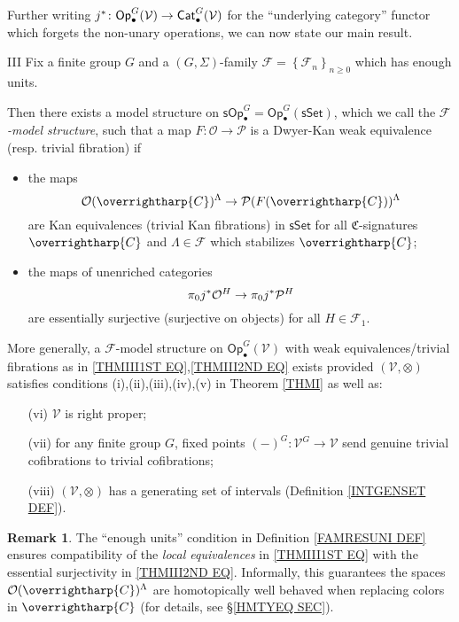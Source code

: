 \documentclass[a4paper,10pt
,draft
]{article}%
\numberwithin{equation}{section}
\numberwithin{figure}{section}
\theoremstyle{definition} %
\newtheorem{remark}[equation]{Remark}%
\newcommand{\set}[1]{\left\{#1\right\}}%
\newcommand{\vect}[1]{\text{\overrightharp{\ensuremath{#1}}}}
\newcommand{\Op}{\mathsf{Op}}%
\newcommand{\F}{\ensuremath{\mathcal F}}
\newcommand{\V}{\ensuremath{\mathcal V}}
\renewcommand{\O}{\ensuremath{\mathcal O}}
\newcommand{\1}{\ensuremath{\mathbbm 1}}%
\begin{document}
Further writing 
$j^{\**} \colon 
\mathsf{Op}^G_{\bullet}(\V) \to \mathsf{Cat}^G_{\bullet}(\V)$
for the ``underlying category''
functor which forgets the non-unary operations, 
we can now state our main result.




\begin{customthm}{III}\label{THMIII}
Fix a finite group $G$ 
and a $(G,\Sigma)$-family $\F = \set{\F_n}_{n \geq 0}$
which has enough units.

Then there exists a model structure on
$\mathsf{sOp}^G_{\bullet} = 
\mathsf{Op}^G_{\bullet}(\mathsf{sSet})$,
which we call the \emph{$\F$-model structure},
such that a map
$F\colon \mathcal{O} \to \mathcal{P}$
is a Dwyer-Kan weak equivalence (resp. trivial fibration) if
\begin{itemize}
\item the maps
\begin{equation}\label{THMIII1ST EQ}
	\O(\vect{C})^{\Lambda} \to \mathcal{P}(F(\vect{C}))^{\Lambda}
\end{equation}
are Kan equivalences (trivial Kan fibrations)
in $\mathsf{sSet}$
for all $\mathfrak{C}$-signatures $\vect{C}$
and $\Lambda \in \F$ which stabilizes $\vect{C}$;
\item 
the maps of unenriched categories
\begin{equation}\label{THMIII2ND EQ}
\pi_0 j^{\**} \O^H 
\to 
\pi_0 j^{\**} \mathcal{P}^H 
\end{equation}
are essentially surjective (surjective on objects)
for all $H \in \F_1$.
\end{itemize}
More generally, a $\F$-model structure on 
$\Op^G_{\bullet}(\V)$
with weak equivalences/trivial fibrations as in 
\eqref{THMIII1ST EQ},\eqref{THMIII2ND EQ}
exists provided $(\V,\otimes)$ satisfies conditions
(i),(ii),(iii),(iv),(v) in Theorem \ref{THMI}
as well as:
\begin{enumerate}
	\item[(vi)] $\V$ is right proper;
	\item[(vii)]
	for any finite group $G$, fixed points
	$(-)^{G} \colon \V^G \to \V$
	send genuine trivial cofibrations to trivial cofibrations;
	\item[(viii)] $(\V, \otimes)$ has a generating set of intervals
	(Definition \ref{INTGENSET DEF}).
\end{enumerate}
\end{customthm}




\begin{remark}\label{WHYEU REM}
The ``enough units'' condition in Definition \ref{FAMRESUNI DEF}
ensures compatibility of the \emph{local equivalences}
in \eqref{THMIII1ST EQ}
with the essential surjectivity in	\eqref{THMIII2ND EQ}.
%
Informally, this guarantees the spaces 
$\O(\vect{C})^{\Lambda}$
are homotopically well behaved when replacing colors 
in $\vect{C}$
(for details, see \S \ref{HMTYEQ SEC}).
\end{remark}
\end{document}
